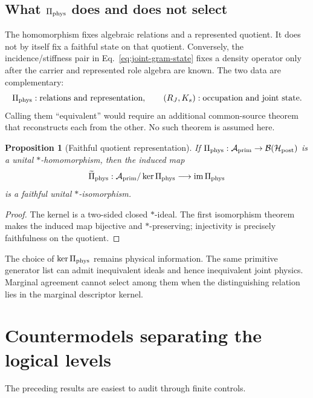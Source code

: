 \documentclass[11pt]{article}
\newtheorem{proposition}{Proposition}
\newcommand{\Aprim}{\mathcal A_{\rm prim}}
\begin{document}
\subsection{What \texorpdfstring{\(\Pi_{\rm phys}\)}{Pi\_phys} does and does not select}

The homomorphism fixes algebraic relations and a represented quotient.  It does
not by itself fix a faithful state on that quotient.  Conversely, the
incidence/stiffness pair in Eq.~\eqref{eq:joint-gram-state} fixes a density
operator only after the carrier and represented role algebra are known.  The
two data are complementary:
\begin{equation}
 \Pi_{\rm phys}:
 \text{relations and representation},
 \qquad
 (R_J,K_s):
 \text{occupation and joint state}.
 \label{eq:representation-state-split}
\end{equation}
Calling them ``equivalent'' would require an additional common-source theorem
that reconstructs each from the other.  No such theorem is assumed here.

\begin{proposition}[Faithful quotient representation]
If \(\Pi_{\rm phys}:\Aprim\to\mathcal B(\mathcal H_{\rm post})\) is a unital
\(*\)-homomorphism, then the induced map
\begin{equation}
 \widetilde\Pi_{\rm phys}:
 \Aprim/\ker\Pi_{\rm phys}\longrightarrow
 \operatorname{im}\Pi_{\rm phys}
 \label{eq:faithful-quotient-map}
\end{equation}
is a faithful unital \(*\)-isomorphism.
\end{proposition}
\begin{proof}
The kernel is a two-sided closed \(*\)-ideal.  The first isomorphism theorem
makes the induced map bijective and \(*\)-preserving; injectivity is precisely
faithfulness on the quotient.
\end{proof}

The choice of \(\ker\Pi_{\rm phys}\) remains physical information.  The same
primitive generator list can admit inequivalent ideals and hence inequivalent
joint physics.  Marginal agreement cannot select among them when the
distinguishing relation lies in the marginal descriptor kernel.

\section{Countermodels separating the logical levels}

The preceding results are easiest to audit through finite controls.
\end{document}
